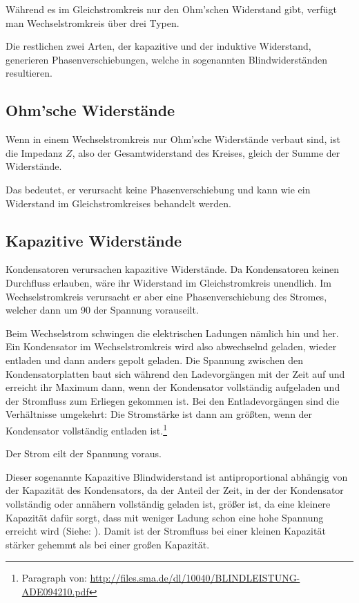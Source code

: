 

Während es im Gleichstromkreis nur den Ohm'schen Widerstand gibt, verfügt man Wechselstromkreis über drei Typen.

Die restlichen zwei Arten, der kapazitive und der induktive Widerstand, generieren Phasenverschiebungen, welche in sogenannten Blindwiderständen resultieren.


\subsection{Ohm'sche Widerstände}		\label{subsec:OhmscherWiderstand}

Wenn in einem Wechselstromkreis nur Ohm'sche Widerstände verbaut sind, ist die Impedanz $Z$, also der Gesamtwiderstand des Kreises, gleich der Summe der Widerstände.

Das bedeutet, er verursacht keine Phasenverschiebung und kann wie ein Widerstand im Gleichstromkreises behandelt werden.


\subsection{Kapazitive Widerstände}		\label{subsec:KapazitiverWiderstand}

Kondensatoren verursachen kapazitive Widerstände. Da Kondensatoren keinen Durchfluss erlauben, wäre ihr Widerstand im Gleichstromkreis unendlich. Im Wechselstromkreis verursacht er aber eine Phasenverschiebung des Stromes, welcher dann um 90\degree{} der Spannung vorauseilt.

Beim Wechselstrom schwingen die elektrischen Ladungen nämlich hin und her. Ein Kondensator im Wechselstromkreis wird also abwechselnd geladen, wieder entladen und dann anders gepolt geladen. Die Spannung zwischen den Kondensatorplatten baut sich während den Ladevorgängen mit der Zeit auf und erreicht ihr Maximum dann, wenn der Kondensator vollständig aufgeladen und der Stromfluss zum Erliegen gekommen ist. Bei den Entladevorgängen sind die Verhältnisse umgekehrt: Die Stromstärke ist dann am größten, wenn der Kondensator vollständig entladen ist.\footnote{Paragraph von: \url{http://files.sma.de/dl/10040/BLINDLEISTUNG-ADE094210.pdf}}

\glqq Der Strom eilt der Spannung voraus.\grqq

\vspace{11pt}

\noindent Dieser sogenannte \glqq Kapazitive Blindwiderstand\grqq{} ist antiproportional abhängig von der Kapazität des Kondensators, da der Anteil der Zeit, in der der Kondensator vollständig oder annähern vollständig geladen ist, größer ist, da eine kleinere Kapazität dafür sorgt, dass mit weniger Ladung schon eine hohe Spannung erreicht wird (Siehe: ). Damit ist der Stromfluss bei einer kleinen Kapazität stärker gehemmt als bei einer großen Kapazität. 

